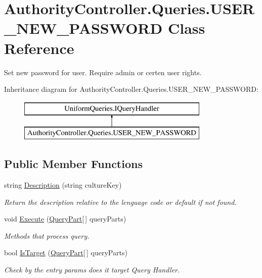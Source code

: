 \hypertarget{class_authority_controller_1_1_queries_1_1_u_s_e_r___n_e_w___p_a_s_s_w_o_r_d}{}\section{Authority\+Controller.\+Queries.\+U\+S\+E\+R\+\_\+\+N\+E\+W\+\_\+\+P\+A\+S\+S\+W\+O\+RD Class Reference}
\label{class_authority_controller_1_1_queries_1_1_u_s_e_r___n_e_w___p_a_s_s_w_o_r_d}


Set new password for user. Require admin or certen user rights.  


Inheritance diagram for Authority\+Controller.\+Queries.\+U\+S\+E\+R\+\_\+\+N\+E\+W\+\_\+\+P\+A\+S\+S\+W\+O\+RD\+:\begin{figure}[H]
\begin{center}
\leavevmode
\includegraphics[height=2.000000cm]{d5/d21/class_authority_controller_1_1_queries_1_1_u_s_e_r___n_e_w___p_a_s_s_w_o_r_d}
\end{center}
\end{figure}
\subsection*{Public Member Functions}
\begin{DoxyCompactItemize}
\item 
string \mbox{\hyperlink{class_authority_controller_1_1_queries_1_1_u_s_e_r___n_e_w___p_a_s_s_w_o_r_d_a04d2af1732d4ac353076d489fe75c696}{Description}} (string culture\+Key)
\begin{DoxyCompactList}\small\item\em Return the description relative to the lenguage code or default if not found. \end{DoxyCompactList}\item 
void \mbox{\hyperlink{class_authority_controller_1_1_queries_1_1_u_s_e_r___n_e_w___p_a_s_s_w_o_r_d_a63a5424c90f45f09f72a530ef0389416}{Execute}} (\mbox{\hyperlink{struct_uniform_queries_1_1_query_part}{Query\+Part}}\mbox{[}$\,$\mbox{]} query\+Parts)
\begin{DoxyCompactList}\small\item\em Methods that process query. \end{DoxyCompactList}\item 
bool \mbox{\hyperlink{class_authority_controller_1_1_queries_1_1_u_s_e_r___n_e_w___p_a_s_s_w_o_r_d_a48ff6874453caf45973ad386bfe5b513}{Is\+Target}} (\mbox{\hyperlink{struct_uniform_queries_1_1_query_part}{Query\+Part}}\mbox{[}$\,$\mbox{]} query\+Parts)
\begin{DoxyCompactList}\small\item\em Check by the entry params does it target Query Handler. \end{DoxyCompactList}\end{DoxyCompactItemize}


